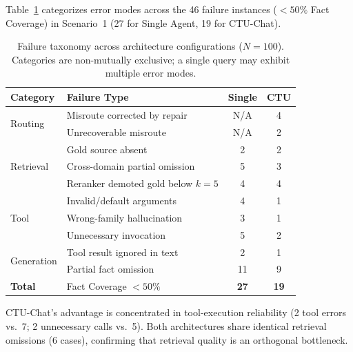Table~\ref{tab:failures} categorizes error modes across the 46 failure instances ($<50\%$ Fact Coverage) in Scenario~1 (27 for Single Agent, 19 for CTU-Chat).

\begin{table}[!htbp]
\centering
\caption{Failure taxonomy across architecture configurations ($N=100$). Categories are non-mutually exclusive; a single query may exhibit multiple error modes.}
\label{tab:failures}
{\small
\begin{tabular}{llcc}
\toprule
\textbf{Category} & \textbf{Failure Type} & \textbf{Single} & \textbf{CTU} \\
\midrule
\multirow{2}{*}{Routing} & Misroute corrected by repair & N/A & 4 \\
 & Unrecoverable misroute & N/A & 2 \\
\midrule
\multirow{3}{*}{Retrieval} & Gold source absent & 2 & 2 \\
 & Cross-domain partial omission & 5 & 3 \\
 & Reranker demoted gold below $k{=}5$ & 4 & 4 \\
\midrule
\multirow{3}{*}{Tool} & Invalid/default arguments & 4 & 1 \\
 & Wrong-family hallucination & 3 & 1 \\
 & Unnecessary invocation & 5 & 2 \\
\midrule
\multirow{2}{*}{Generation} & Tool result ignored in text & 2 & 1 \\
 & Partial fact omission & 11 & 9 \\
\midrule
\textbf{Total} & Fact Coverage $<50\%$ & \textbf{27} & \textbf{19} \\
\bottomrule
\end{tabular}}
\end{table}

CTU-Chat's advantage is concentrated in tool-execution reliability (2 tool errors vs.\ 7; 2 unnecessary calls vs.\ 5). Both architectures share identical retrieval omissions (6 cases), confirming that retrieval quality is an orthogonal bottleneck.


